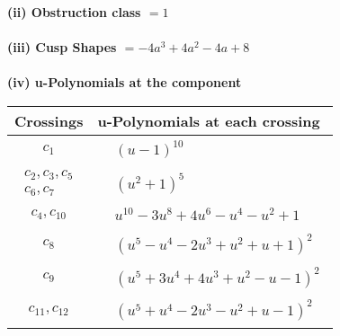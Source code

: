 \documentclass[1p]{elsarticle_modified}
\theoremstyle{definition}
\begin{document}
\flushleft \textbf{(ii) Obstruction class $= 1$}\\~\\
\flushleft \textbf{(iii) Cusp Shapes $= -4 a^3+4 a^2-4 a+8$}\\~\\
\newpage\renewcommand{\arraystretch}{1}
\flushleft \textbf{(iv) u-Polynomials at the component}\newline \\
\begin{tabular}{m{50pt}|m{274pt}}
Crossings & \hspace{64pt}u-Polynomials at each crossing \\
\hline $$\begin{aligned}c_{1}\end{aligned}$$&$\begin{aligned}
&(u-1)^{10}
\end{aligned}$\\
\hline $$\begin{aligned}c_{2},c_{3},c_{5}\\c_{6},c_{7}\end{aligned}$$&$\begin{aligned}
&(u^2+1)^5
\end{aligned}$\\
\hline $$\begin{aligned}c_{4},c_{10}\end{aligned}$$&$\begin{aligned}
&u^{10}-3 u^8+4 u^6- u^4- u^2+1
\end{aligned}$\\
\hline $$\begin{aligned}c_{8}\end{aligned}$$&$\begin{aligned}
&(u^5- u^4-2 u^3+u^2+u+1)^2
\end{aligned}$\\
\hline $$\begin{aligned}c_{9}\end{aligned}$$&$\begin{aligned}
&(u^5+3 u^4+4 u^3+u^2- u-1)^2
\end{aligned}$\\
\hline $$\begin{aligned}c_{11},c_{12}\end{aligned}$$&$\begin{aligned}
&(u^5+u^4-2 u^3- u^2+u-1)^2
\end{aligned}$\\
\hline
\end{tabular}\\~\\
\end{document}
